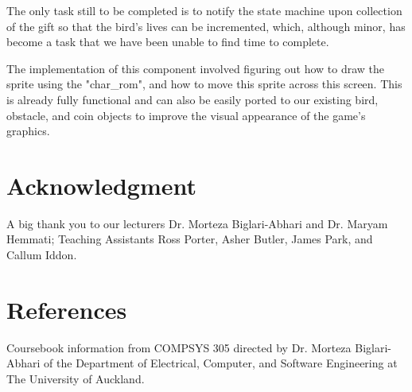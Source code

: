 \documentclass[conference]{IEEEtran}
\begin{document}
The only task still to be completed is to notify the state machine upon collection of the gift so that the bird's lives can be incremented, which, although minor, has become a task that we have been unable to find time to complete.

The implementation of this component involved figuring out how to draw the sprite using the "char\_rom", and how to move this sprite across this screen. This is already fully functional and can also be easily ported to our existing bird, obstacle, and coin objects to improve the visual appearance of the game's graphics.

\section*{Acknowledgment}

A big thank you to our lecturers Dr. Morteza Biglari-Abhari and Dr. Maryam Hemmati; Teaching Assistants Ross Porter, Asher Butler, James Park, and Callum Iddon.

\section*{References}

Coursebook information from COMPSYS 305 directed by Dr. Morteza Biglari-Abhari of the Department of Electrical, Computer, and Software Engineering at The University of Auckland.
\end{document}
